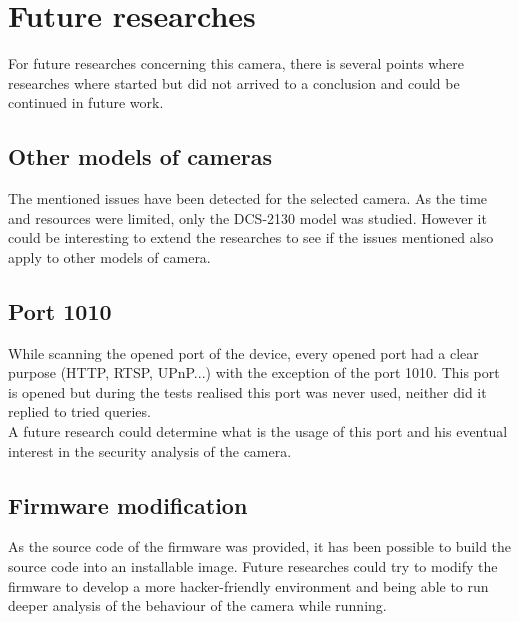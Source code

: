 \section{Future researches}
\label{sec:dcs-future}

For future researches concerning this camera, there is several points where researches where started but did not arrived to a conclusion and could be continued in future work.

\subsection{Other models of cameras}

The mentioned issues have been detected for the selected camera.
As the time and resources were limited, only the DCS-2130 model was studied.
However it could be interesting to extend the researches to see if the issues mentioned also apply to other models of camera.


\subsection{Port 1010}

While scanning the opened port of the device, every opened port had a clear purpose (HTTP, RTSP, UPnP...) with the exception of the port 1010.
This port is opened but during the tests realised this port was never used, neither did it replied to tried queries.\\

A future research could determine what is the usage of this port and his eventual interest in the security analysis of the camera.

\subsection{Firmware modification}

As the source code of the firmware was provided, it has been possible to build the source code into an installable image.
Future researches could try to modify the firmware to develop a more hacker-friendly environment and being able to run deeper analysis of the behaviour of the camera while running.
